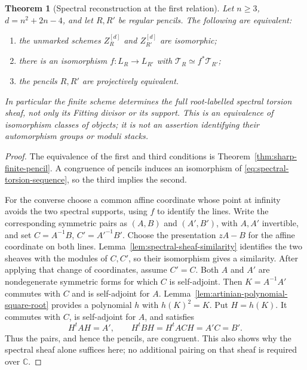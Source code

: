 \documentclass[11pt,reqno]{amsart}
\numberwithin{equation}{section}
\newtheorem{theorem}{Theorem}[section]
\theoremstyle{definition}\newtheorem{definition}[theorem]{Definition}
\theoremstyle{remark}\newtheorem{remark}[theorem]{Remark}
\newcommand{\C}{\mathbb C}\newcommand{\Q}{\mathbb Q}
\begin{document}
\begin{theorem}[Spectral reconstruction at the first relation]
\label{thm:spectral-finite-torelli}
Let \(n\ge3\), \(d=n^2+2n-4\), and let \(R,R'\) be
regular pencils.  The following are equivalent:
\begin{enumerate}
\item the unmarked schemes \(Z_R^{[d]}\) and \(Z_{R'}^{[d]}\)
are isomorphic;
\item there is an isomorphism \(f:L_R\to L_{R'}\) with
\(\mathcal T_R\simeq f^*\mathcal T_{R'}\);
\item the pencils \(R,R'\) are projectively equivalent.
\end{enumerate}
In particular the finite scheme determines the full root-labelled
spectral torsion sheaf, not only its Fitting divisor or its support.
This is an equivalence of isomorphism classes of objects; it is not
an assertion identifying their automorphism groups or moduli stacks.
\end{theorem}
\begin{proof}
The equivalence of the first and third conditions is
Theorem~\ref{thm:sharp-finite-pencil}.  A congruence of pencils
induces an isomorphism of \eqref{eq:spectral-torsion-sequence},
so the third implies the second.

For the converse choose a common affine coordinate whose point at
infinity avoids the two spectral supports, using \(f\) to identify
the lines.  Write the corresponding symmetric pairs as \((A,B)\)
and \((A',B')\), with \(A,A'\) invertible, and set
\(C=A^{-1}B\), \(C'=A'^{-1}B'\).  Choose the presentation \(zA-B\) for the affine
coordinate on both lines.  Lemma~\ref{lem:spectral-sheaf-similarity}
identifies the two sheaves with the modules of \(C,C'\), so their
isomorphism gives a similarity.  After applying
that change of coordinates, assume \(C'=C\).  Both \(A\) and
\(A'\) are nondegenerate symmetric forms for which \(C\) is
self-adjoint.  Then \(K=A^{-1}A'\) commutes with \(C\)
and is self-adjoint for \(A\).  Lemma~\ref{lem:artinian-polynomial-square-root}
provides a polynomial \(h\) with \(h(K)^2=K\).  Put \(H=h(K)\).  It commutes with \(C\), is
self-adjoint for \(A\), and satisfies
\[
 H^tAH=A',\qquad H^tBH=H^tACH=A'C=B'.
\]
Thus the pairs, and hence the pencils, are congruent.  This also shows
why the spectral sheaf alone suffices here; no additional pairing on
that sheaf is required over \(\C\).
\end{proof}
\end{document}
